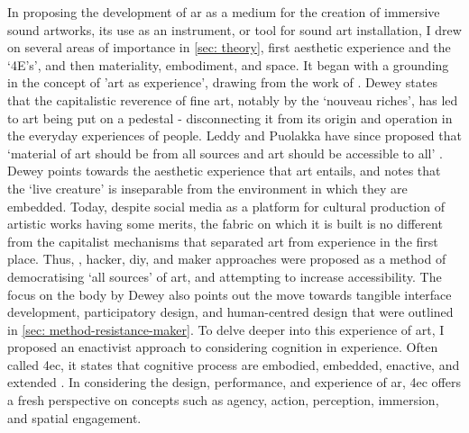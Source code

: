 In proposing the development of \gls{ar} as a medium for the creation of immersive sound artworks, its use as an instrument, or tool for sound art installation, I drew on several areas of importance in \autoref{sec: theory}, first aesthetic experience and the `4E's', and then materiality, embodiment, and space. It began with a grounding in the concept of 'art as experience', drawing from the work of \citep{dewey1934}. Dewey states that the capitalistic reverence of fine art, notably by the `nouveau riches', has led to art being put on a pedestal - disconnecting it from its origin and operation in the everyday experiences of people. Leddy and Puolakka have since proposed that `material of art should be from all sources and art should be accessible to all' \citeyearpar{leddy2021}. Dewey points towards the aesthetic experience that art entails, and notes that the `live creature' is inseparable from the environment in which they are embedded. Today, despite social media as a platform for cultural production of artistic works having some merits, the fabric on which it is built is no different from the capitalist mechanisms that separated art from experience in the first place. Thus, , hacker, \gls{diy}, and maker approaches were proposed as a method of democratising `all sources' of art, and attempting to increase accessibility. The focus on the body by Dewey also points out the move towards tangible interface development, participatory design, and human-centred design that were outlined in \autoref{sec: method-resistance-maker}. To delve deeper into this experience of art, I proposed an enactivist approach to considering cognition in experience. Often called \gls{4ec}, it states that cognitive process are embodied, embedded, enactive, and extended \citep{gallagher2017}. In considering the design, performance, and experience of \gls{ar}, \gls{4ec} offers a fresh perspective on concepts such as agency, action, perception, immersion, and spatial engagement.

